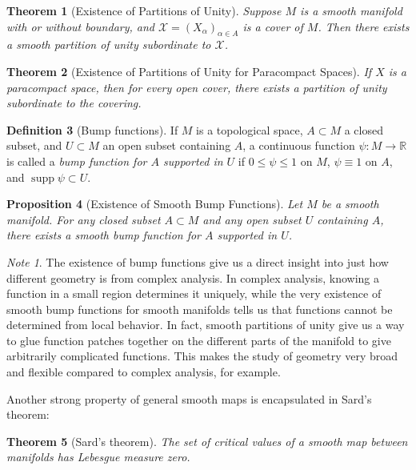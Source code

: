 \documentclass[reqno]{amsart}
\newtheorem{theorem}{Theorem}[section]
\newtheorem{proposition}[theorem]{Proposition}
\theoremstyle{definition}
\newtheorem{definition}[theorem]{Definition}
\theoremstyle{remark}
\newtheorem*{note}{Note}
\DeclareMathOperator{\supp}{supp}
\begin{document}
\begin{theorem}[Existence of Partitions of Unity]
    Suppose $M$ is a smooth manifold with
    or without boundary, and
    $\mathcal{X} = \left( X_{\alpha} \right)_{\alpha \in A}$ 
    is a cover of $M$. Then there
    exists a smooth partition of unity subordinate
    to $\mathcal{X}$.
\end{theorem}

\begin{theorem}[Existence of Partitions of Unity for
    Paracompact Spaces]
    If $X$ is a paracompact space, then for every
    open cover, there exists a partition of
    unity subordinate to the covering.
\end{theorem}


\begin{definition}[Bump functions]
    If $M$ is a topological space, $A \subset M$ 
    a closed subset, and
    $U \subset M$ an open subset containing $A$, a
    continuous function
    $\psi \colon M \to \mathbb{R}$ is called a
    \textit{bump function for $A$ supported
    in $U$} if $0 \le \psi  \le 1$ on
    $M$, $\psi \equiv 1$ on $A$, and $\supp \psi \subset U$.
\end{definition}

\begin{proposition}[Existence of Smooth Bump Functions]
    Let $M$ be a smooth manifold. For any closed
    subset $A \subset M$ and any open subset
    $U$ containing $A$, there exists a smooth bump function
    for $A$ supported in $U$.
\end{proposition}

\begin{note}
    The existence of bump functions give us a
    direct insight into just how different
    geometry is from complex analysis. 
    In complex analysis, knowing a function in a
    small region determines it uniquely, while
    the very existence of smooth bump functions
    for smooth manifolds tells us
    that functions cannot be determined from local
    behavior.
    In fact, smooth partitions of unity give
    us a way to glue function patches together
    on the different parts of the manifold to give
    arbitrarily complicated functions.
    This makes the study of geometry very broad and flexible compared
    to complex analysis, for example.
\end{note}


Another strong property of general smooth maps is
encapsulated in Sard's theorem:

\begin{theorem}[Sard's theorem]
    The set of critical values of a smooth
    map between manifolds has Lebesgue measure zero.
\end{theorem}
\end{document}
